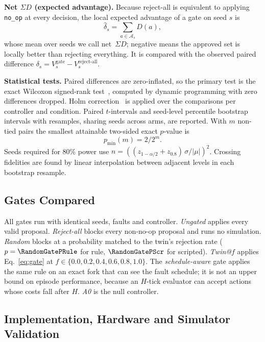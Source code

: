 \documentclass[conference]{IEEEtran}
\newcommand{\netSD}{net~$\Sigma D$}
\begin{document}
\textbf{Net $\Sigma D$ (expected advantage).} Because reject-all is equivalent to applying \texttt{no\_op} at every decision, the local expected advantage of a gate on seed $s$ is
\begin{equation}
\widehat{\delta}_s=\sum_{a\in\mathcal{A}_s} D(a),
\label{eq:expadv}
\end{equation}
whose mean over seeds we call \netSD{}; negative means the approved set is locally better than rejecting everything. It is compared with the observed paired difference $\delta_s=V_s^{\text{gate}}-V_s^{\text{reject-all}}$.

\textbf{Statistical tests.} Paired differences are zero-inflated, so the primary test is the exact Wilcoxon signed-rank test~\cite{wilcoxon}, computed by dynamic programming with zero differences dropped. Holm correction~\cite{holm} is applied over the \HolmFamilySize{} comparisons per controller and condition. Paired $t$-intervals and seed-level percentile bootstrap intervals with \BootResamples{} resamples, sharing seeds across arms, are reported. With $m$ non-tied pairs the smallest attainable two-sided exact $p$-value is
\begin{equation}
p_{\min}(m)=2/2^{m}.
\label{eq:pmin}
\end{equation}
Seeds required for 80\% power use $n=\left((z_{1-\alpha/2}+z_{0.8})\,\sigma/|\mu|\right)^2$. Crossing fidelities are found by linear interpolation between adjacent levels in each bootstrap resample.

\subsection{Gates Compared}

All gates run with identical seeds, faults and controller. \emph{Ungated} applies every valid proposal. \emph{Reject-all} blocks every non-no-op proposal and runs no simulation. \emph{Random} blocks at a probability matched to the twin's rejection rate ($p=\RandomGatePRule$ for rule, $\RandomGatePScr$ for scripted). \emph{Twin@$f$} applies Eq.~\eqref{eq:gate} at $f\in\{0.0,0.2,0.4,0.6,0.8,1.0\}$. The \emph{schedule-aware} gate applies the same rule on an exact fork that can see the fault schedule; it is not an upper bound on episode performance, because an $H$-tick evaluator can accept actions whose costs fall after $H$. \emph{A0} is the null controller.

\subsection{Implementation, Hardware and Simulator Validation}
\end{document}

